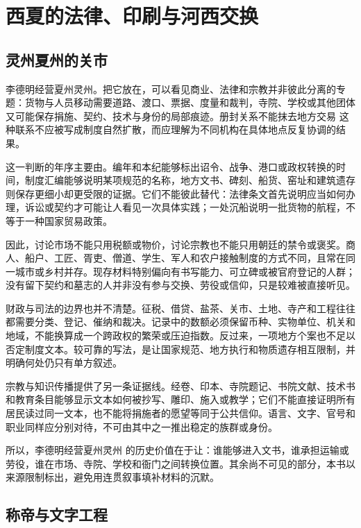 \section{西夏的法律、印刷与河西交换}

\subsection{灵州夏州的关市}

李德明经营夏州灵州。把它放在，可以看见商业、法律和宗教并非彼此分离的专题：货物与人员移动需要道路、渡口、票据、度量和裁判，寺院、学校或其他团体又可能保存捐施、契约、技术与身份的局部痕迹。册封关系不能抹去地方交易 这种联系不应被写成制度自然扩散，而应理解为不同机构在具体地点反复协调的结果。

这一判断的年序主要由。编年和本纪能够标出诏令、战争、港口或政权转换的时间，制度汇编能够说明某项规范的名称，地方文书、碑刻、船货、窑址和建筑遗存则保存更细小却更受限的证据。它们不能彼此替代：法律条文首先说明应当如何办理，诉讼或契约才可能让人看见一次具体实践；一处沉船说明一批货物的航程，不等于一种国家贸易政策。

因此，讨论市场不能只用税额或物价，讨论宗教也不能只用朝廷的禁令或褒奖。商人、船户、工匠、胥吏、僧道、学生、军人和农户接触制度的方式不同，且常在同一城市或乡村并存。现存材料特别偏向有书写能力、可立碑或被官府登记的人群；没有留下契约和墓志的人并非没有参与交换、劳役或信仰，只是较难被直接听见。

财政与司法的边界也并不清楚。征税、借贷、盐茶、关市、土地、寺产和工程往往都需要分类、登记、催纳和裁决。记录中的数额必须保留币种、实物单位、机关和地域，不能换算成一个跨政权的繁荣或压迫指数。反过来，一项地方个案也不足以否定制度文本。较可靠的写法，是让国家规范、地方执行和物质遗存相互限制，并明确何处仍只有单方叙述。

宗教与知识传播提供了另一条证据线。经卷、印本、寺院题记、书院文献、技术书和教育条目能够显示文本如何被抄写、雕印、施入或教学；它们不能直接证明所有居民读过同一文本，也不能将捐施者的愿望等同于公共信仰。语言、文字、官号和职业同样应分别对待，不可由其中之一推出稳定的族群或身份。

所以，李德明经营夏州灵州 的历史价值在于让：谁能够进入文书，谁承担运输或劳役，谁在市场、寺院、学校和衙门之间转换位置。其余尚不可见的部分，本书以来源限制标出，避免用连贯叙事填补材料的沉默。

\subsection{称帝与文字工程}

